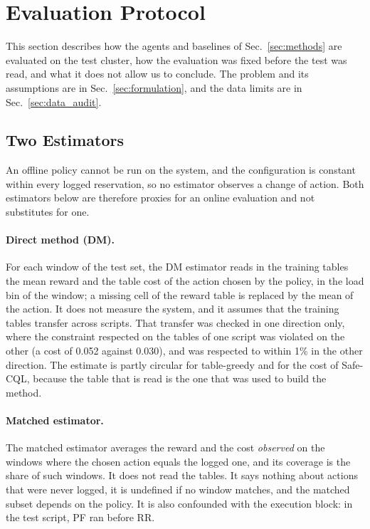 \section{Evaluation Protocol}
\label{sec:protocol}
\label{sec:eval}

This section describes how the agents and baselines of Sec.~\ref{sec:methods} are evaluated on the test cluster, how the evaluation was fixed before the test was read, and what it does not allow us to conclude.%
The problem and its assumptions are in Sec.~\ref{sec:formulation}, and the data limits are in Sec.~\ref{sec:data_audit}.%

\subsection{Two Estimators}
\label{sec:estimators}

An offline policy cannot be run on the system, and the configuration is constant within every logged reservation, so no estimator observes a change of action.%
Both estimators below are therefore proxies for an online evaluation and not substitutes for one.%

\paragraph{Direct method (DM).}
For each window of the test set, the DM estimator reads in the training tables the mean reward and the table cost of the action chosen by the policy, in the load bin of the window; a missing cell of the reward table is replaced by the mean of the action.%
It does not measure the system, and it assumes that the training tables transfer across scripts.%
That transfer was checked in one direction only, where the constraint respected on the tables of one script was violated on the other (a cost of 0.052 against 0.030), and was respected to within 1\% in the other direction.%
The estimate is partly circular for table-greedy and for the cost of Safe-CQL, because the table that is read is the one that was used to build the method.%

\paragraph{Matched estimator.}
The matched estimator averages the reward and the cost \emph{observed} on the windows where the chosen action equals the logged one, and its coverage is the share of such windows.%
It does not read the tables.%
It says nothing about actions that were never logged, it is undefined if no window matches, and the matched subset depends on the policy.%
It is also confounded with the execution block: in the test script, PF ran before RR.%

